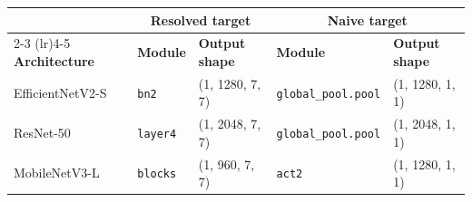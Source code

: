 \begin{tabular}{lll ll}
\toprule
 & \multicolumn{2}{c}{\textbf{Resolved target}} & \multicolumn{2}{c}{\textbf{Naive target}} \\
\cmidrule(lr){2-3} \cmidrule(lr){4-5}
\textbf{Architecture} & \textbf{Module} & \textbf{Output shape} & \textbf{Module} & \textbf{Output shape} \\
\midrule
EfficientNetV2-S & \texttt{bn2} & (1, 1280, 7, 7) & \texttt{global\_pool.pool} & (1, 1280, 1, 1) \\
ResNet-50 & \texttt{layer4} & (1, 2048, 7, 7) & \texttt{global\_pool.pool} & (1, 2048, 1, 1) \\
MobileNetV3-L & \texttt{blocks} & (1, 960, 7, 7) & \texttt{act2} & (1, 1280, 1, 1) \\
\bottomrule
\end{tabular}
